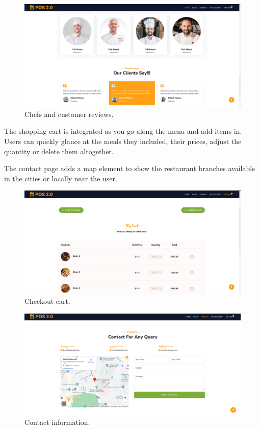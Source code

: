 \documentclass[12pt, a4paper]{article}
\theoremstyle{styleth}
\theoremstyle{styledef}
\begin{document}
\begin{figure}[H]
	\centering
	\includegraphics[width=16cm]{Screenshot 2022-05-01 003050.png}
	\caption{Chefs and customer reviews.}
	\label{fig:reviews}
\end{figure}

The shopping cart is integrated as you go along the menu and add items in. Users can quickly glance at the meals they included, their prices, adjust the quantity or delete them altogether.

\vspace{5mm}
The contact page adds a map element to show the restaurant branches available in the cities or locally near the user.
\begin{figure}[H]
	\centering
	\includegraphics[width=16cm]{Screenshot 2022-05-01 003209.png}
	\caption{Checkout cart.}
	\label{fig:cart}
\end{figure}

\begin{figure}[H]
	\centering
	\includegraphics[width=16cm]{Screenshot 2022-05-01 003849.png}
	\caption{Contact information.}
	\label{fig:cnt}
\end{figure}
\end{document}
